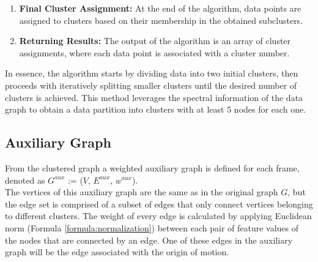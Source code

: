 \begin{enumerate}
  \item \textbf{Final Cluster Assignment:}
  At the end of the algorithm, data points are assigned to clusters based on their membership in the obtained subclusters.
  
  \item \textbf{Returning Results:}
  The output of the algorithm is an array of cluster assignments, where each data point is associated with a cluster number.
  
\end{enumerate}

In essence, the algorithm starts by dividing data into two initial clusters, then proceeds with iteratively splitting smaller clusters until the desired number of clusters is achieved.
This method leverages the spectral information of the data graph to obtain a data partition into clusters with at least 5 nodes for each one.


\subsection{Auxiliary Graph}
From the clustered graph a weighted auxiliary graph is defined for each frame, denoted as $G^{aux}$ := ($V$, $E^{aux}$, $w^{aux}$). \\
The vertices of this auxiliary graph are the same as in the original graph $G$, but the edge set is comprised of a subset of edges that only connect vertices belonging to different clusters.
The weight of every edge is calculated by applying Euclidean norm (Formula \ref{formula:normalization}) between each pair of feature values of the nodes that are connected by an edge.
One of these edges in the auxiliary graph will be the edge associated with the origin of motion.
\\

